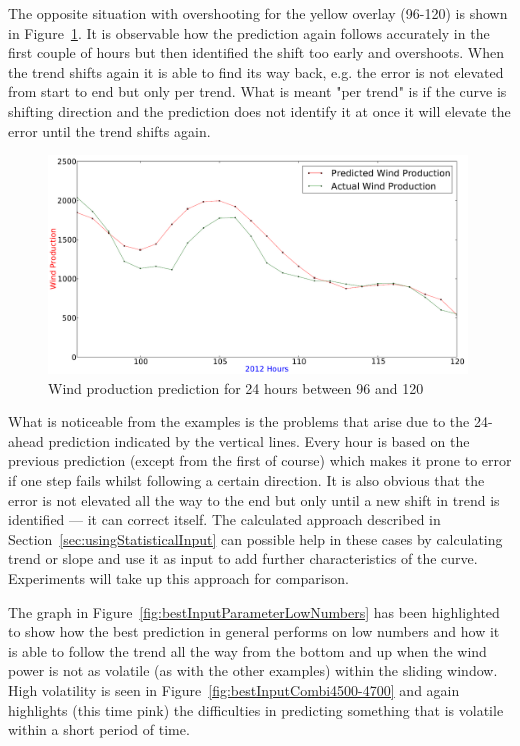 The opposite situation with overshooting for the yellow overlay (96-120) is shown in Figure~\ref{fig:bestInputCombi96-120}. It is observable how the prediction again follows accurately in the first couple of hours but then identified the shift too early and overshoots. When the trend shifts again it is able to find its way back, e.g. the error is not elevated from start to end but only per trend. What is meant "per trend" is if the curve is shifting direction and the prediction does not identify it at once it will elevate the error until the trend shifts again. 

\begin{figure}[H]
\centering
\includegraphics[width=0.99\textwidth]{billeder/bestInputCombi96-120.png}
\caption{Wind production prediction for 24 hours between 96 and 120}
\label{fig:bestInputCombi96-120}
\end{figure} 

What is noticeable from the examples is the problems that arise due to the 24-ahead prediction indicated by the vertical lines. Every hour is based on the previous prediction (except from the first of course) which makes it prone to error if one step fails whilst following a certain direction. It is also obvious that the error is not elevated all the way to the end but only until a new shift in trend is identified --- it can correct itself. The calculated approach described in Section~\ref{sec:usingStatisticalInput} can possible help in these cases by calculating trend or slope and use it as input to add further characteristics of the curve. Experiments will take up this approach for comparison.

The graph in Figure~\ref{fig:bestInputParameterLowNumbers} has been highlighted to show how the best prediction in general performs on low numbers and how it is able to follow the trend all the way from the bottom and up when the wind power is not as volatile (as with the other examples) within the sliding window. High volatility is seen in Figure~\ref{fig:bestInputCombi4500-4700} and again highlights (this time pink) the difficulties in predicting something that is volatile within a short period of time.

